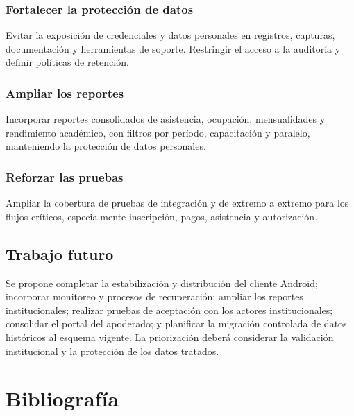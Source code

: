 \documentclass[12pt,a4paper,oneside]{report}
\begin{document}
\subsection{Fortalecer la protección de datos}
Evitar la exposición de credenciales y datos personales en registros, capturas, documentación y herramientas de soporte. Restringir el acceso a la auditoría y definir políticas de retención.

\subsection{Ampliar los reportes}
Incorporar reportes consolidados de asistencia, ocupación, mensualidades y rendimiento académico, con filtros por período, capacitación y paralelo, manteniendo la protección de datos personales.

\subsection{Reforzar las pruebas}
Ampliar la cobertura de pruebas de integración y de extremo a extremo para los flujos críticos, especialmente inscripción, pagos, asistencia y autorización.

\section{Trabajo futuro}

Se propone completar la estabilización y distribución del cliente Android; incorporar monitoreo y procesos de recuperación; ampliar los reportes institucionales; realizar pruebas de aceptación con los actores institucionales; consolidar el portal del apoderado; y planificar la migración controlada de datos históricos al esquema vigente. La priorización deberá considerar la validación institucional y la protección de los datos tratados.

\chapter*{Bibliografía}
\end{document}
